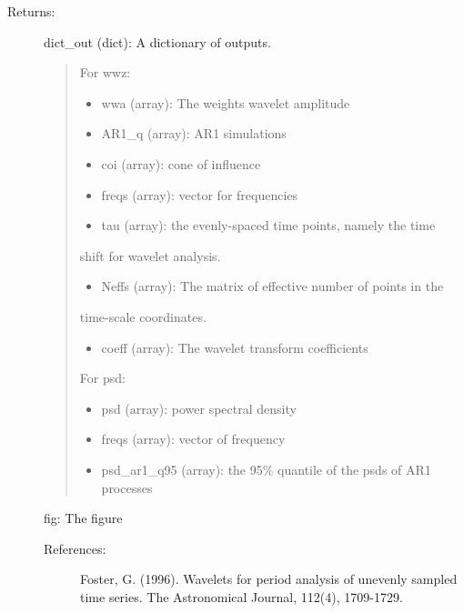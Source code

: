 \documentclass[letterpaper,10pt,english]{sphinxmanual}
\begin{document}
\begin{fulllineitems}
\begin{description}
\begin{description}
\end{description}

\item[{Returns:}] \leavevmode
dict\_out (dict): A dictionary of outputs.
\begin{quote}

For wwz:
\begin{itemize}
\item {} 
wwa (array): The weights wavelet amplitude

\item {} 
AR1\_q (array): AR1 simulations

\item {} 
coi (array): cone of influence

\item {} 
freqs (array): vector for frequencies

\item {} 
tau (array): the evenly-spaced time points, namely the time

\end{itemize}

shift for wavelet analysis.
\begin{itemize}
\item {} 
Neffs (array): The matrix of effective number of points in the

\end{itemize}

time-scale coordinates.
\begin{itemize}
\item {} 
coeff (array): The wavelet transform coefficients

\end{itemize}

For psd:
\begin{itemize}
\item {} 
psd (array): power spectral density

\item {} 
freqs (array): vector of frequency

\item {} 
psd\_ar1\_q95 (array): the 95\% quantile of the psds of AR1 processes

\end{itemize}
\end{quote}

fig: The figure
\begin{description}
\item[{References:}] \leavevmode
Foster, G. (1996). Wavelets for period analysis of unevenly
sampled time series. The Astronomical Journal, 112(4), 1709-1729.


\end{description}
\end{description}
\end{fulllineitems}
\end{document}
